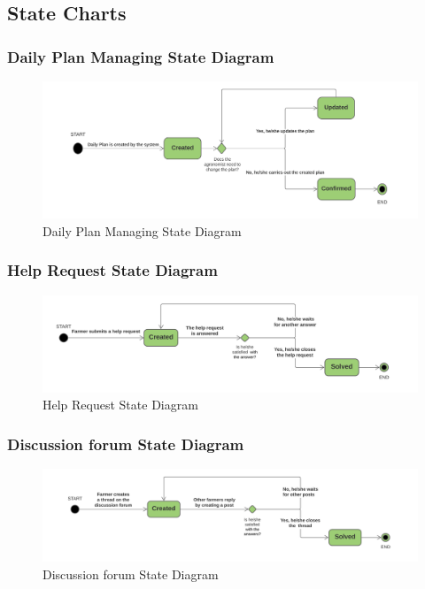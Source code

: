 \subsection{State Charts}

\subsubsection{Daily Plan Managing State Diagram}
\begin{figure}[h!]
  \includegraphics[width=\textwidth,height=\textheight,keepaspectratio]{./Images/State Chart DailyPlan.png}
  \caption{Daily Plan Managing State Diagram}
\end{figure}

\subsubsection{Help Request State Diagram}
\begin{figure}[h!]
  \includegraphics[width=\textwidth,height=\textheight,keepaspectratio]{./Images/State Chart HelpRequest.png}
  \caption{Help Request State Diagram}
\end{figure}

\subsubsection{Discussion forum State Diagram}
\begin{figure}[h!]
  \includegraphics[width=\textwidth,height=\textheight,keepaspectratio]{./Images/State Chart DiscussionForum.png}
  \caption{Discussion forum State Diagram}
\end{figure}

\newpage
